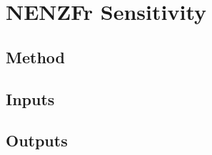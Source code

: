 
\newpage
\section{NENZFr Sensitivity}
\label{chapter-sensitivity}


\subsection{Method}

\subsection{Inputs}

\subsection{Outputs}